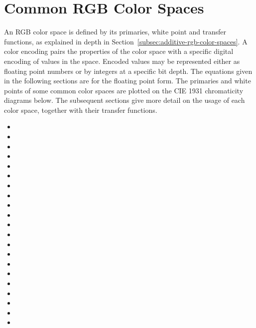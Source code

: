 \section{Common RGB Color Spaces}%
\label{sec:common-rgb-color-spaces}

An RGB color space is defined by its primaries, white point and transfer functions, as explained in depth in Section~\ref{subsec:additive-rgb-color-spaces}.
A color encoding pairs the properties of the color space with a specific digital encoding of values in the space.
Encoded values may be represented either as floating point numbers or by integers at a specific bit depth.
The equations given in the following sections are for the floating point form.
The primaries and white points of some common color spaces are plotted on the CIE 1931 chromaticity diagrams below.
The subsequent sections give more detail on the usage of each color space, together with their transfer functions.

\begin{itemize}
    \item {}
    \item {}
    \item {}
    \item {}
    \item {}
    \item {}
    \item {}
    \item {}
    \item {}
    \item {}
    \item {}
    \item {}
    \item {}
    \item {}
    \item {}
    \item {}
    \item {}
    \item {}
    \item {}
    \item {}
    \item {}
\end{itemize}

